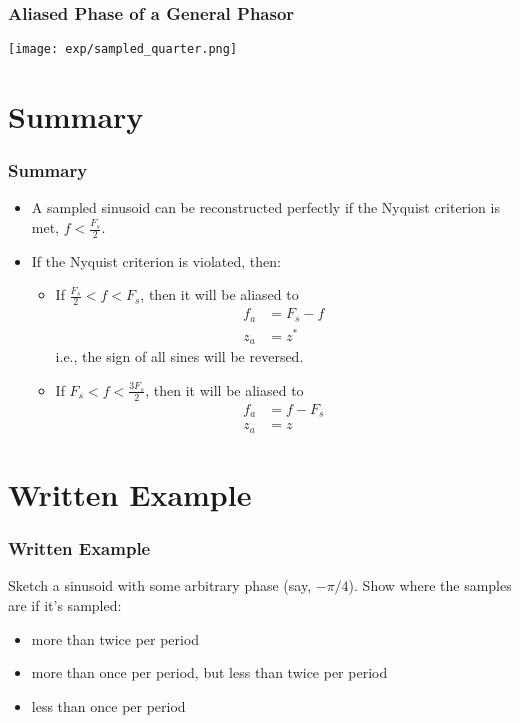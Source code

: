 \documentclass{beamer}
\begin{document}
\begin{frame}
  \frametitle{Aliased Phase of a  General Phasor}
  \centerline{\texttt{[image: exp/sampled\_quarter.png]}}
\end{frame}

\section[Summary]{Summary}
\setcounter{subsection}{1}

\begin{frame}
  \frametitle{Summary}

  \begin{itemize}
  \item A sampled sinusoid can be reconstructed perfectly if the
    Nyquist criterion is met, $f < \frac{F_s}{2}$.
  \item If the Nyquist criterion is violated, then:
    \begin{itemize}
    \item If $\frac{F_s}{2}<f<F_s$, then it will be aliased to
      \begin{align*}
        f_a &= F_s-f\\
        z_a &= z^*
      \end{align*}
      i.e., the sign of all sines will be reversed.
    \item If $F_s < f < \frac{3F_s}{2}$, then it will be aliased to
      \begin{align*}
        f_a &= f-F_s\\
        z_a &= z
      \end{align*}
    \end{itemize}
  \end{itemize}
\end{frame}

\section[Example]{Written Example}
\setcounter{subsection}{1}

\begin{frame}
  \frametitle{Written Example}

  Sketch a sinusoid with some arbitrary phase (say, $-\pi/4$).  Show
  where the samples are if it's sampled:
  \begin{itemize}
  \item more than twice per period
  \item more than once per period, but less than twice per period
  \item less than once per period
  \end{itemize}
\end{frame}
  
\end{document}
